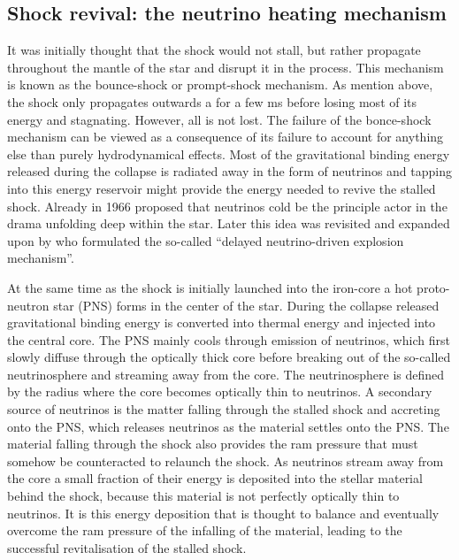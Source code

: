 \subsection{Shock revival: the neutrino heating mechanism}
It was initially thought that the shock would not stall, but rather propagate
throughout the mantle of the star and disrupt it in the process. 
This mechanism is known as the bounce-shock or prompt-shock mechanism.
As mention above, the shock only propagates outwards a for a few ms before losing most of its
energy and stagnating. However, all is not lost. The failure of the bonce-shock mechanism
can be viewed as a consequence of its failure to account for anything else than purely hydrodynamical effects. Most of the gravitational binding energy released during the collapse is radiated away in
the form of neutrinos and tapping into this energy reservoir might provide the energy needed to revive the stalled shock.
Already in 1966 \cite{colgate_66} proposed that neutrinos cold be the principle
actor in the drama unfolding deep within the star. Later this idea was revisited and expanded upon by \cite{wilson_85}
who formulated the so-called ``delayed neutrino-driven explosion mechanism''.

At the same time as the shock is initially launched into the iron-core a hot proto-neutron star (PNS)
forms in the center of the star. During the collapse released gravitational binding energy is converted into thermal energy and injected into the central core. The PNS mainly cools
through emission of neutrinos, which first slowly diffuse through the optically thick core
before breaking out of the so-called neutrinosphere and streaming away from the core.
The neutrinosphere is defined by the radius where the core becomes optically thin to neutrinos.
A secondary source of neutrinos is the matter falling through the stalled shock and accreting onto the PNS, which releases neutrinos as the material settles onto the PNS. The material falling through the
shock also provides the ram pressure that must somehow be counteracted to relaunch the shock.
As neutrinos stream away from the core a small fraction of their energy is deposited into the
stellar material behind the shock, because this material is not perfectly optically thin to neutrinos.
It is this energy deposition that is thought to balance and eventually overcome the ram pressure of the infalling of the material, leading to the successful revitalisation of the stalled shock.

